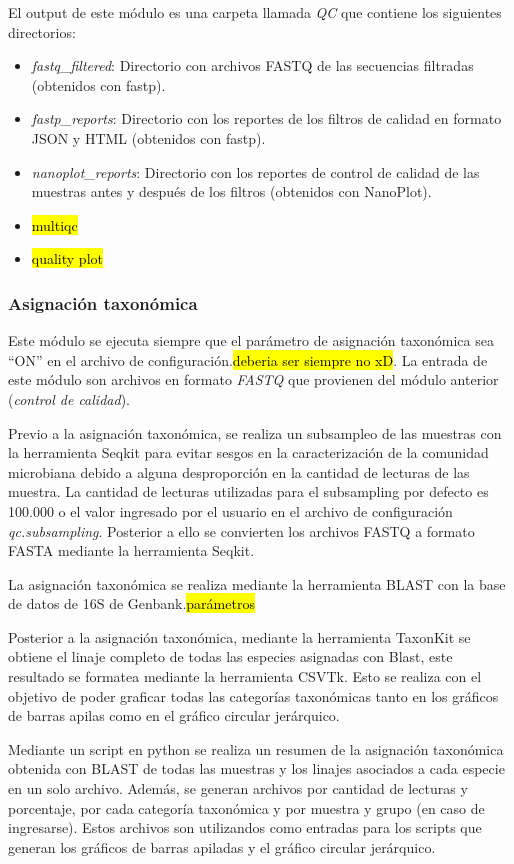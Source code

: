El output de este módulo es una carpeta llamada \textit{QC} que contiene los siguientes directorios:
\begin{itemize}
    \item \textit{fastq\_filtered}: Directorio con archivos FASTQ de las secuencias filtradas (obtenidos con fastp).
    \item \textit{fastp\_reports}: Directorio con los reportes de los filtros de calidad en formato JSON y HTML (obtenidos con fastp).
    \item \textit{nanoplot\_reports}: Directorio con los reportes de control de calidad de las muestras antes y después de los filtros (obtenidos con NanoPlot).
    \item \hl{multiqc}
    \item \hl{quality plot}
\end{itemize}

\subsubsection{Asignación taxonómica}
Este módulo se ejecuta siempre que el parámetro de asignación taxonómica sea ``ON'' en el archivo de configuración.\hl{deberia ser siempre no xD}.
La entrada de este módulo son archivos en formato \textit{FASTQ} que provienen del módulo anterior (\textit{control de calidad}).

Previo a la asignación taxonómica, se realiza un subsampleo de las muestras con la herramienta Seqkit para evitar sesgos en la caracterización de la comunidad microbiana debido a alguna desproporción en la cantidad de lecturas de las muestra.
La cantidad de lecturas utilizadas para el subsampling por defecto es 100.000 o el valor ingresado por el usuario en el archivo de configuración \textit{qc.subsampling}.
Posterior a ello se convierten los archivos FASTQ a formato FASTA mediante la herramienta Seqkit.

La asignación taxonómica se realiza mediante la herramienta BLAST con la base de datos de 16S de Genbank.\hl{parámetros}

Posterior a la asignación taxonómica, mediante la herramienta TaxonKit se obtiene el linaje completo de todas las especies asignadas con Blast, este resultado se formatea mediante la herramienta CSVTk. 
Esto se realiza con el objetivo de poder graficar todas las categorías taxonómicas tanto en los gráficos de barras apilas como en el gráfico circular jerárquico.

Mediante un script en python se realiza un resumen de la asignación taxonómica obtenida con BLAST de todas las muestras y los linajes asociados a cada especie en un solo archivo. Además, se generan archivos por cantidad de lecturas y porcentaje, por cada categoría taxonómica y por muestra y grupo (en caso de ingresarse).
Estos archivos son utilizandos como entradas para los scripts que generan los gráficos de barras apiladas y  el gráfico circular jerárquico.




